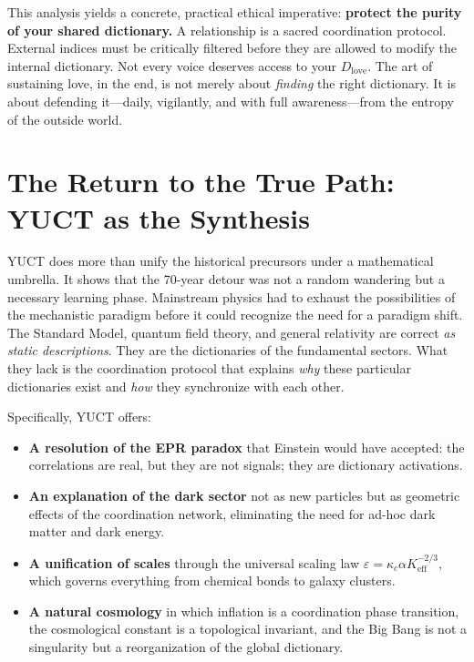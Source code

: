 \documentclass[12pt,a4paper]{article}
\begin{document}
	This analysis yields a concrete, practical ethical imperative: \textbf{protect the purity of your shared dictionary.} A relationship is a sacred coordination protocol. External indices must be critically filtered before they are allowed to modify the internal dictionary. Not every voice deserves access to your \(D_{\text{love}}\). The art of sustaining love, in the end, is not merely about \emph{finding} the right dictionary. It is about defending it—daily, vigilantly, and with full awareness—from the entropy of the outside world.
	
	\section{The Return to the True Path: YUCT as the Synthesis}
	
	YUCT does more than unify the historical precursors under a mathematical umbrella. It shows that the 70-year detour was not a random wandering but a necessary learning phase. Mainstream physics had to exhaust the possibilities of the mechanistic paradigm before it could recognize the need for a paradigm shift. The Standard Model, quantum field theory, and general relativity are correct \emph{as static descriptions}. They are the dictionaries of the fundamental sectors. What they lack is the coordination protocol that explains \emph{why} these particular dictionaries exist and \emph{how} they synchronize with each other.
	
	Specifically, YUCT offers:
	\begin{itemize}
		\item \textbf{A resolution of the EPR paradox} that Einstein would have accepted: the correlations are real, but they are not signals; they are dictionary activations.
		\item \textbf{An explanation of the dark sector} not as new particles but as geometric effects of the coordination network, eliminating the need for ad-hoc dark matter and dark energy.
		\item \textbf{A unification of scales} through the universal scaling law \(\varepsilon = \kappa_c \alpha K_{\mathrm{eff}}^{-2/3}\), which governs everything from chemical bonds to galaxy clusters.
		\item \textbf{A natural cosmology} in which inflation is a coordination phase transition, the cosmological constant is a topological invariant, and the Big Bang is not a singularity but a reorganization of the global dictionary.
	\end{itemize}
	
\end{document}
